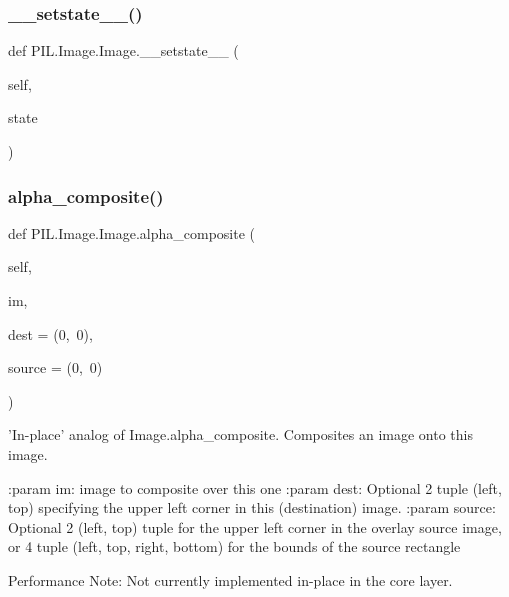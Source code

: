 \subsubsection{\texorpdfstring{\+\_\+\+\_\+setstate\+\_\+\+\_\+()}{\_\_setstate\_\_()}}
{\footnotesize\ttfamily def P\+I\+L.\+Image.\+Image.\+\_\+\+\_\+setstate\+\_\+\+\_\+ (\begin{DoxyParamCaption}\item[{}]{self,  }\item[{}]{state }\end{DoxyParamCaption})}

\mbox{\label{classPIL_1_1Image_1_1Image_aa82fac6927bcb106b907e0c1811f2c6a}} 
\subsubsection{\texorpdfstring{alpha\+\_\+composite()}{alpha\_composite()}}
{\footnotesize\ttfamily def P\+I\+L.\+Image.\+Image.\+alpha\+\_\+composite (\begin{DoxyParamCaption}\item[{}]{self,  }\item[{}]{im,  }\item[{}]{dest = {\ttfamily (0,~0)},  }\item[{}]{source = {\ttfamily (0,~0)} }\end{DoxyParamCaption})}

\begin{DoxyVerb}'In-place' analog of Image.alpha_composite. Composites an image
onto this image.

:param im: image to composite over this one
:param dest: Optional 2 tuple (left, top) specifying the upper
  left corner in this (destination) image.
:param source: Optional 2 (left, top) tuple for the upper left
  corner in the overlay source image, or 4 tuple (left, top, right,
  bottom) for the bounds of the source rectangle

Performance Note: Not currently implemented in-place in the core layer.
\end{DoxyVerb}
 \mbox{\label{classPIL_1_1Image_1_1Image_a999ebe874d82490f56f85d0336e750ce}} 
